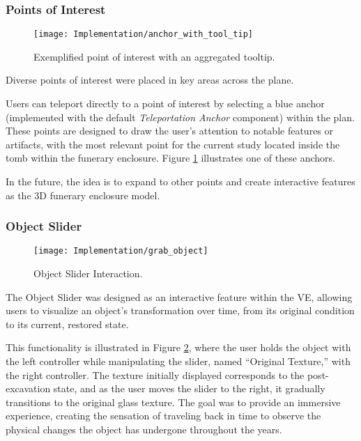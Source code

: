 \subsubsection{Points of Interest}
\label{sec:points_interest}

\begin{figure}[h!]
    \centering
    \texttt{[image: Implementation/anchor\_with\_tool\_tip]}
    \caption{Exemplified point of interest with an aggregated tooltip.}
    \label{fig:points_interest}
\end{figure}

Diverse points of interest were placed in key areas across the plane.

Users can teleport directly to a point of interest by selecting a blue anchor (implemented with the default \emph{Teleportation Anchor} component) within the plan. These points are designed to draw the user’s attention to notable features or artifacts, with the most relevant point for the current study located inside the tomb within the funerary enclosure.
Figure \ref{fig:points_interest} illustrates one of these anchors.

In the future, the idea is to expand to other points and create interactive features as the \gls{3D} funerary enclosure model. 
\subsubsection{Object Slider}
\label{sec:object_slider}

 \begin{figure}[h!]
    \centering
    \texttt{[image: Implementation/grab\_object]}
    \caption{Object Slider Interaction.}
    \label{fig:object_slider}
\end{figure}

The Object Slider was designed as an interactive feature within the \gls{VE}, allowing users to visualize an object's transformation over time, from its original condition to its current, restored state. 

This functionality is illustrated in Figure \ref{fig:object_slider}, where the user holds the object with the left controller while manipulating the slider, named “Original Texture,” with the right controller. 
The texture initially displayed corresponds to the post-excavation state, and as the user moves the slider to the right, it gradually transitions to the original glass texture.
The goal was to provide an immersive experience, creating the sensation of traveling back in time to observe the physical changes the object has undergone throughout the years.

